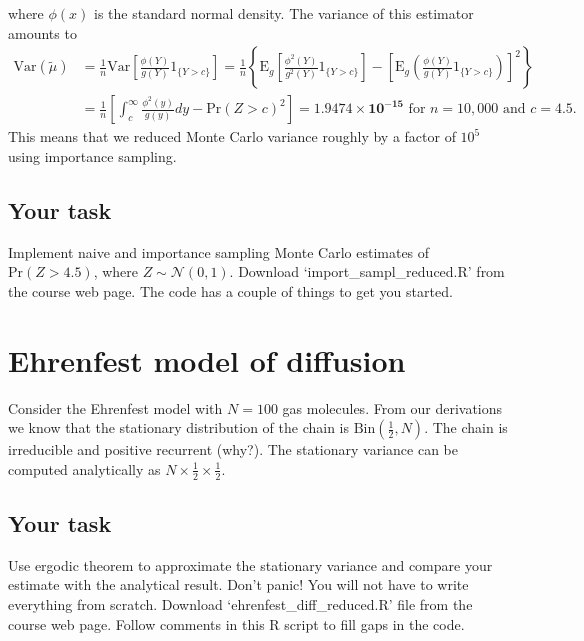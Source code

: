 \documentclass[11pt]{article}
\numberwithin{algorithm}{section}
\theoremstyle{remark}
\theoremstyle{definition}
\numberwithin{equation}{section}
\numberwithin{figure}{section}
\begin{document}
  where $\phi(x)$ is the standard normal density. The variance of this estimator amounts to 
  \begin{equation*}
    \begin{split}
      \text{Var}(\tilde{\mu}) &= \frac{1}{n} \text{Var}\left[ 
        \frac{\phi(Y)}{g(Y)}1_{\{Y > c\}}\right] = 
      \frac{1}{n}\left\{\text{E}_g\left[\frac{\phi^2(Y)}{g^2(Y)}1_{\{Y > c\}}\right] 
        - \left[\text{E}_g\left(\frac{\phi(Y)}{g(Y)}1_{\{Y > c\}}\right)\right]^2\right\} \\ 
      &=\frac{1}{n}\left[\int_c^\infty \frac{\phi^2(y)}{g(y)}dy - \text{Pr}(Z > c)^2\right] 
      = \mathbf{1.9474\times 10^{-15}} \text{ for } n=10,000 \text{ and } c=4.5.
    \end{split}
  \end{equation*}
  This means that we reduced Monte Carlo variance roughly by a factor of $10^5$ using importance 
  sampling.


\subsection*{Your task}
Implement naive and importance sampling Monte Carlo estimates of $\text{Pr}(Z>4.5)$, where
$Z \sim \mathcal{N}(0,1)$. Download `import\_sampl\_reduced.R' from 
the course web page. The code has a couple of things to get you started.

\section*{Ehrenfest model of diffusion}
  Consider the Ehrenfest model with $N=100$ gas molecules. From our derivations we know that 
  the stationary distribution of the chain is $\text{Bin}(\frac{1}{2},N)$. The chain is irreducible
  and positive recurrent (why?). The stationary variance can be computed analytically as 
  $N\times\frac{1}{2}\times\frac{1}{2}$. 

\subsection*{Your task}
Use ergodic theorem to approximate the stationary variance and compare your estimate with the analytical result.
Don't panic! You will not have to write everything from scratch. Download `ehrenfest\_diff\_reduced.R' file from the course
web page. Follow comments in this R script to fill gaps in the code. 
\end{document}
